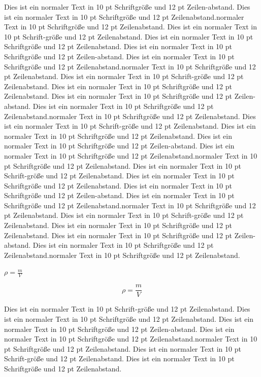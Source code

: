 \documentclass[10pt,a4paper,oneside,abstracton]{scrartcl}
\begin{document}
\begin{multicols}{2}
 Dies ist ein normaler Text in 10 pt Schriftgröße und 12 pt Zeilen-abstand. Dies ist ein normaler Text in 10 pt Schriftgröße und 12 pt Zeilenabstand.normaler Text in 10 pt Schriftgröße und 12 pt Zeilenabstand. Dies ist ein normaler Text in 10 pt Schrift-größe und 12 pt Zeilenabstand. Dies ist ein normaler Text in 10 pt Schriftgröße und 12 pt Zeilenabstand.
 Dies ist ein normaler Text in 10 pt Schriftgröße und 12 pt Zeilen-abstand. Dies ist ein normaler Text in 10 pt Schriftgröße und 12 pt Zeilenabstand.normaler Text in 10 pt Schriftgröße und 12 pt Zeilenabstand. Dies ist ein normaler Text in 10 pt Schrift-größe und 12 pt Zeilenabstand. Dies ist ein normaler Text in 10 pt Schriftgröße und 12 pt Zeilenabstand.
 Dies ist ein normaler Text in 10 pt Schriftgröße und 12 pt Zeilen-abstand. Dies ist ein normaler Text in 10 pt Schriftgröße und 12 pt Zeilenabstand.normaler Text in 10 pt Schriftgröße und 12 pt Zeilenabstand. Dies ist ein normaler Text in 10 pt Schrift-größe und 12 pt Zeilenabstand. Dies ist ein normaler Text in 10 pt Schriftgröße und 12 pt Zeilenabstand.
 Dies ist ein normaler Text in 10 pt Schriftgröße und 12 pt Zeilen-abstand. Dies ist ein normaler Text in 10 pt Schriftgröße und 12 pt Zeilenabstand.normaler Text in 10 pt Schriftgröße und 12 pt Zeilenabstand. Dies ist ein normaler Text in 10 pt Schrift-größe und 12 pt Zeilenabstand. Dies ist ein normaler Text in 10 pt Schriftgröße und 12 pt Zeilenabstand.
 Dies ist ein normaler Text in 10 pt Schriftgröße und 12 pt Zeilen-abstand. Dies ist ein normaler Text in 10 pt Schriftgröße und 12 pt Zeilenabstand.normaler Text in 10 pt Schriftgröße und 12 pt Zeilenabstand. Dies ist ein normaler Text in 10 pt Schrift-größe und 12 pt Zeilenabstand. Dies ist ein normaler Text in 10 pt Schriftgröße und 12 pt Zeilenabstand.
 Dies ist ein normaler Text in 10 pt Schriftgröße und 12 pt Zeilen-abstand. Dies ist ein normaler Text in 10 pt Schriftgröße und 12 pt Zeilenabstand.normaler Text in 10 pt Schriftgröße und 12 pt Zeilenabstand. 


$\rho = \frac{m}{V}$

\begin{equation}
{\rho = \frac{m}{V}}
\end{equation}

Dies ist ein normaler Text in 10 pt Schrift-größe und 12 pt Zeilenabstand. Dies ist ein normaler Text in 10 pt Schriftgröße und 12 pt Zeilenabstand.
 Dies ist ein normaler Text in 10 pt Schriftgröße und 12 pt Zeilen-abstand. Dies ist ein normaler Text in 10 pt Schriftgröße und 12 pt Zeilenabstand.normaler Text in 10 pt Schriftgröße und 12 pt Zeilenabstand. Dies ist ein normaler Text in 10 pt Schrift-größe und 12 pt Zeilenabstand. Dies ist ein normaler Text in 10 pt Schriftgröße und 12 pt Zeilenabstand. 
 

\end{multicols}
\end{document}
